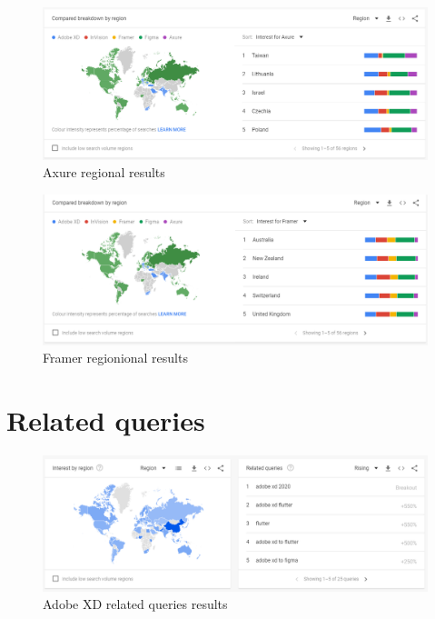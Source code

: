     \begin{figure}[H]
        \centering
        \includegraphics[scale=0.4]{figures/trends/axure-region.png}
        \caption{Axure regional results}
        \label{app:google-trends-region-axure}
    \end{figure}

    \begin{figure}[H]
        \centering
        \includegraphics[scale=0.4]{figures/trends/framer-region.png}
        \caption{Framer regionional results}
        \label{app:google-trends-region-framer}
    \end{figure}
   
   \section{Related queries} 
    \begin{figure}[H]
        \centering
        \includegraphics[scale=0.4]{figures/trends/adobe-xd-queries.png}
        \caption{Adobe XD related queries results}
        \label{app:google-trends-queries-adobe-xd}
    \end{figure}
    
